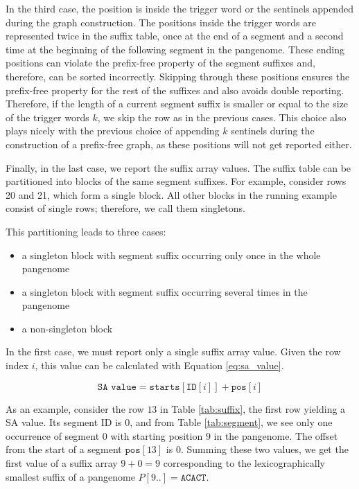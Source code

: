 In the third case, the position is inside the trigger word or the sentinels appended during the graph construction.
The positions inside the trigger words are represented twice in the suffix table, once at the end of a segment and a second time at the beginning of the following segment in the pangenome.
These ending positions can violate the prefix-free property of the segment suffixes and, therefore, can be sorted incorrectly.
Skipping through these positions ensures the prefix-free property for the rest of the suffixes and also avoids double reporting.
Therefore, if the length of a current segment suffix is smaller or equal to the size of the trigger words $k$, we skip the row as in the previous cases.
This choice also plays nicely with the previous choice of appending $k$ sentinels during the construction of a prefix-free graph, as these positions will not get reported either.

Finally, in the last case, we report the suffix array values.
The suffix table can be partitioned into blocks of the same segment suffixes.
For example, consider rows 20 and 21, which form a single block.
All other blocks in the running example consist of single rows; therefore, we call them singletons.

This partitioning leads to three cases:
\begin{itemize}
    \item a singleton block with segment suffix occurring only once in the whole pangenome
    \item a singleton block with segment suffix occurring several times in the pangenome
    \item a non-singleton block
\end{itemize}

In the first case, we must report only a single suffix array value.
Given the row index $i$, this value can be calculated with Equation \ref{eq:sa_value}.

\begin{equation}
    \label{eq:sa_value}
    \texttt{SA value} = \texttt{starts}[\texttt{ID}[i]] + \texttt{pos}[i]
\end{equation}

As an example, consider the row $13$ in Table \ref{tab:suffix}, the first row yielding a SA value.
Its segment ID is $0$, and from Table \ref{tab:segment}, we see only one occurrence of segment $0$ with starting position $9$ in the pangenome.
The offset from the start of a segment $\texttt{pos}[13]$ is $0$.
Summing these two values, we get the first value of a suffix array $9 + 0 = 9$ corresponding to the lexicographically smallest suffix of a pangenome $P[9..] = \texttt{ACACT}$.

